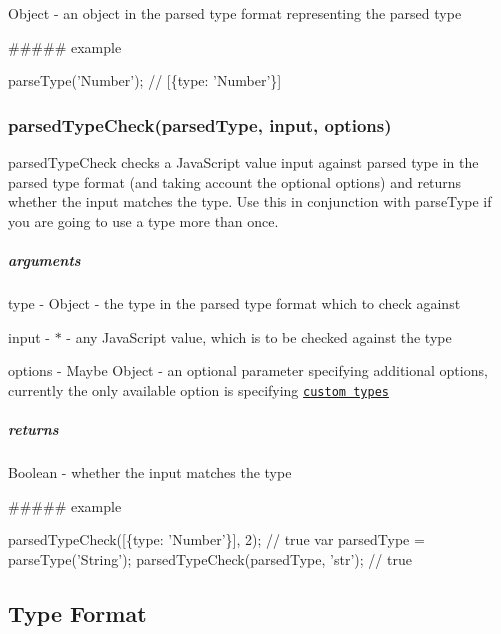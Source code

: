 {\ttfamily Object} -\/ an object in the parsed type format representing the parsed type

\#\#\#\#\# example 
\begin{DoxyCode}
parseType(\textcolor{stringliteral}{'Number'}); \textcolor{comment}{// [\{type: 'Number'\}]}
\end{DoxyCode}
 \subsubsection*{parsed\+Type\+Check(parsed\+Type, input, options)}

{\ttfamily parsed\+Type\+Check} checks a Java\+Script value {\ttfamily input} against parsed {\ttfamily type} in the parsed type format (and taking account the optional {\ttfamily options}) and returns whether the {\ttfamily input} matches the {\ttfamily type}. Use this in conjunction with {\ttfamily parse\+Type} if you are going to use a type more than once.

\subparagraph*{arguments}


\begin{DoxyItemize}
\item type -\/ {\ttfamily Object} -\/ the type in the parsed type format which to check against
\item input -\/ {\ttfamily $\ast$} -\/ any Java\+Script value, which is to be checked against the type
\item options -\/ {\ttfamily Maybe Object} -\/ an optional parameter specifying additional options, currently the only available option is specifying \href{#custom-types}{\tt custom types}
\end{DoxyItemize}

\subparagraph*{returns}

{\ttfamily Boolean} -\/ whether the input matches the type

\#\#\#\#\# example 
\begin{DoxyCode}
parsedTypeCheck([\{type: \textcolor{stringliteral}{'Number'}\}], 2); \textcolor{comment}{// true}
var parsedType = parseType(\textcolor{stringliteral}{'String'});
parsedTypeCheck(parsedType, \textcolor{stringliteral}{'str'});     \textcolor{comment}{// true}
\end{DoxyCode}


\label{_type-format}%
 \subsection*{Type Format}

